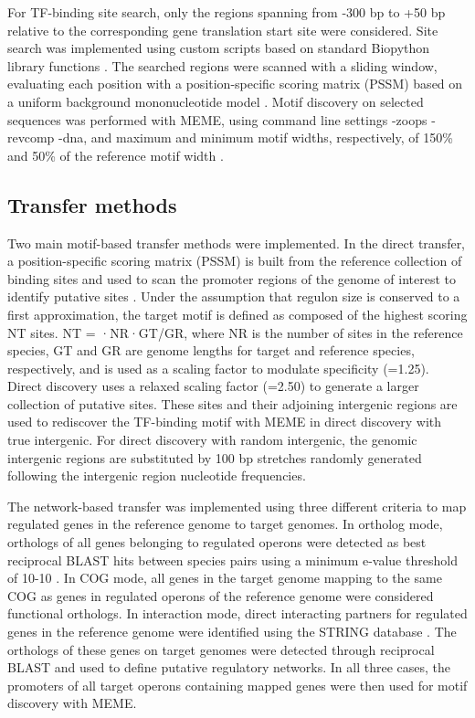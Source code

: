 For TF-binding site search, only the regions spanning from -300 bp to +50 bp
relative to the corresponding gene translation start site were considered. Site
search was implemented using custom scripts based on standard Biopython library
functions \cite{cock2009biopython}. The searched regions were scanned with a
sliding window, evaluating each position with a position-specific scoring
matrix (PSSM) based on a uniform background mononucleotide model
\cite{stormo2000dna}. Motif discovery on selected sequences was performed with
MEME, using command line settings -zoops -revcomp -dna, and maximum and minimum
motif widths, respectively, of 150\% and 50\% of the reference motif width
\cite{bailey2015meme}.

\subsection{Transfer methods}

Two main motif-based transfer methods were implemented. In the direct transfer,
a position-specific scoring matrix (PSSM) is built from the reference
collection of binding sites and used to scan the promoter regions of the genome
of interest to identify putative sites \cite{stormo2000dna}. Under the
assumption that regulon size is conserved to a first approximation, the target
motif is defined as composed of the highest scoring NT sites. NT = ·NR·GT/GR,
where NR is the number of sites in the reference species, GT and GR are genome
lengths for target and reference species, respectively, and is used as a
scaling factor to modulate specificity (=1.25). Direct discovery uses a relaxed
scaling factor (=2.50) to generate a larger collection of putative sites. These
sites and their adjoining intergenic regions are used to rediscover the
TF-binding motif with MEME in direct discovery with true intergenic. For direct
discovery with random intergenic, the genomic intergenic regions are
substituted by 100 bp stretches randomly generated following the intergenic
region nucleotide frequencies.

The network-based transfer was implemented using three different criteria to
map regulated genes in the reference genome to target genomes. In ortholog
mode, orthologs of all genes belonging to regulated operons were detected as
best reciprocal BLAST hits between species pairs using a minimum e-value
threshold of 10-10 \cite{moreno2008choosing}. In COG mode, all genes in the
target genome mapping to the same COG as genes in regulated operons of the
reference genome were considered functional orthologs. In interaction mode,
direct interacting partners for regulated genes in the reference genome were
identified using the STRING database \cite{franceschini2013string}. The
orthologs of these genes on target genomes were detected through reciprocal
BLAST and used to define putative regulatory networks. In all three cases, the
promoters of all target operons containing mapped genes were then used for
motif discovery with MEME.

